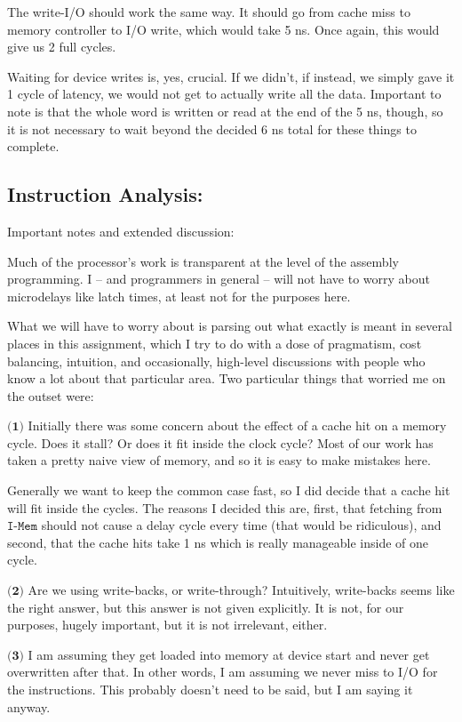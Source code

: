 \documentclass[a4paper]{article}
\begin{document}
The write-I/O should work the same way. It should go from cache miss to memory controller to I/O write, which would take 5 ns. Once again, this would give us 2 full cycles.

Waiting for device writes is, yes, crucial. If we didn't, if instead, we simply gave it 1 cycle of latency, we would not get to actually write all the data. Important to note is that the whole word is written or read at the end of the 5 ns, though, so it is not necessary to wait beyond the decided 6 ns total for these things to complete.

\subsection{Instruction Analysis:}

Important notes and extended discussion:

Much of the processor's work is transparent at the level of the assembly programming. I -- and programmers in general -- will not have to worry about microdelays like latch times, at least not for the purposes here.

What we will have to worry about is parsing out what exactly is meant in several places in this assignment, which I try to do with a dose of pragmatism, cost balancing, intuition, and occasionally, high-level discussions with people who know a lot about that particular area. Two particular things that worried me on the outset were:

$\textbf{(1)}$ Initially there was some concern about the effect of a cache hit on a memory cycle. Does it stall? Or does it fit inside the clock cycle? Most of our work has taken a pretty naive view of memory, and so it is easy to make mistakes here.

Generally we want to keep the common case fast, so I did decide that a cache hit will fit inside the cycles. The reasons I decided this are, first, that fetching from $\texttt{I-Mem}$ should not cause a delay cycle every time (that would be ridiculous), and second, that the cache hits take 1 ns which is really manageable inside of one cycle.

$\textbf{(2)}$ Are we using write-backs, or write-through? Intuitively, write-backs seems like the right answer, but this answer is not given explicitly. It is not, for our purposes, hugely important, but it is not irrelevant, either.

$\textbf{(3)}$ I am assuming they get loaded into memory at device start and never get overwritten after that. In other words, I am assuming we never miss to I/O for the instructions. This probably doesn't need to be said, but I am saying it anyway.
\end{document}

